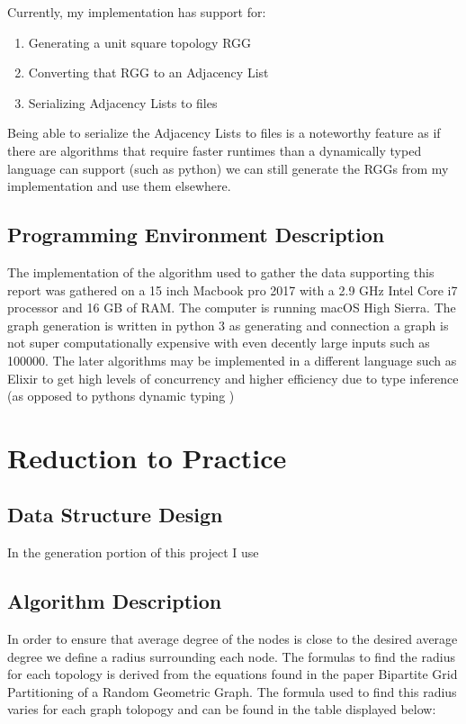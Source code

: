 \documentclass{article}
\begin{document}
  Currently, my implementation has support for:
  \begin{enumerate}
    \item Generating a unit square topology RGG
    \item Converting that RGG to an Adjacency List
    \item Serializing Adjacency Lists to files
  \end{enumerate}
  Being able to serialize the Adjacency Lists to files is a noteworthy feature as if there are algorithms that require faster runtimes than a dynamically typed language can support (such as python) we can still generate the RGGs from my implementation and use them elsewhere.

  \subsection{Programming Environment Description}
  	The implementation of the algorithm used to gather the data supporting this report was gathered on a 15 inch Macbook pro 2017 with a 2.9 GHz Intel Core i7 processor and 16 GB of RAM.
    The computer is running macOS High Sierra.
    The graph generation is written in python 3 as generating and connection a graph is not super computationally expensive with even decently large inputs such as 100000.
    The later algorithms may be implemented in a different language such as Elixir to get high levels of concurrency and higher efficiency due to type inference (as opposed to pythons dynamic typing
    )
  \section{Reduction to Practice}
	  \subsection{Data Structure Design}
    In the generation portion of this project I use
	  \subsection{Algorithm Description}
    In order to ensure that average degree of the nodes is close to the desired average degree we define a radius surrounding each node.
    The formulas to find the radius for each topology is derived from the equations found in the paper Bipartite Grid Partitioning of a Random Geometric Graph\cite{chen2017bipartite}.
    The formula used to find this radius varies for each graph tolopogy and can be found in the table displayed below:
\end{document}
